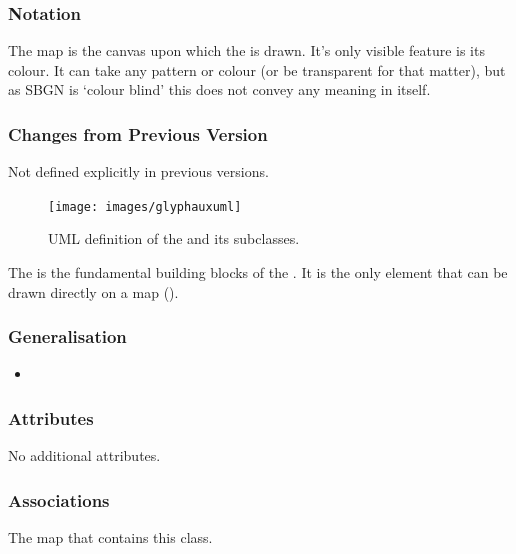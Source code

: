 \subsubsection{Notation}

The map is the canvas upon which the \PDl is drawn. It's only visible
feature is its colour. It can take any pattern or colour (or be
transparent for that matter), but as SBGN is `colour blind' this does
not convey any meaning in itself.

\subsubsection{Changes from Previous Version}

Not defined explicitly in previous versions.

\label{defn:SBGNGlyph}

\begin{figure}[htb]
  \centering
  \texttt{[image: images/glyphauxuml]}
\caption{UML definition of the  and its subclasses.}
  \label{fig:techref:glyphauxuml}
\end{figure}

The  is the fundamental building blocks of the
\PDl. It is the only element that can be drawn directly on a map
().

\subsubsection{Generalisation}

\begin{itemize}
\item {}
\end{itemize}

\subsubsection{Attributes}

No additional attributes.

\subsubsection{Associations}

\begin{attributes}
 The map that contains this class.
\end{attributes}

